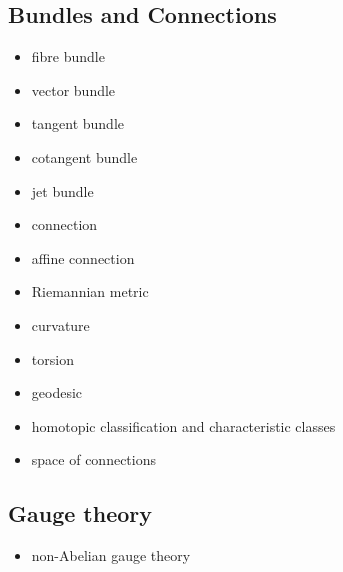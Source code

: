 \documentclass[12pt]{article}
\begin{document}
\subsection{Bundles and Connections}
\begin{itemize}
\item fibre bundle
\item vector bundle
\item tangent bundle
\item cotangent bundle
\item jet bundle
\item connection
\item affine connection
\item Riemannian metric
\item curvature
\item torsion
\item geodesic
\item homotopic classification and characteristic classes
\item space of connections
\end{itemize}

\subsection{Gauge theory}
\begin{itemize}
\item non-Abelian gauge theory
\end{itemize}


\end{document}
